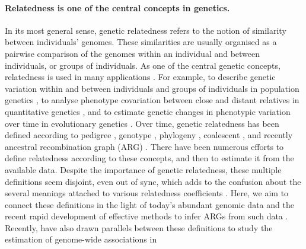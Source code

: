 




\paragraph{Relatedness is one of the central concepts in genetics.}
%
In its most general sense, genetic relatedness refers to the notion of
similarity between individuals' genomes.
%
These similarities are usually organised as a pairwise comparison of the
genomes within an individual and between individuals, or groups of
individuals.
%
As one of the central genetic concepts, relatedness is used in many
applications \citep{weir2006genetic, speed2015relatedness}.
%
For example, to describe genetic variation within and between individuals
and groups of individuals in population genetics
\citep{crow2009introduction, charlesworth2010elements},
to analyse phenotype covariation between close and distant relatives in
quantitative genetics \citep{falconer1996introduction, lynch1998genetics},
and to estimate genetic changes in phenotypic variation over time in
evolutionary genetics \citep{walsh2018evolution, arnold2023evolutionary}.
%
Over time, genetic relatedness has been defined according to
pedigree \citep{fisher1919correlation, wright1922coefficients},
genotype \citep{cotterman1940calculus, malecot1948mathematiques, malecot1969mathemathics},
phylogeny \citep{lynch1991methods},
coalescent \citep{slatkin1991inbreeding}, and
recently ancestral recombination graph (ARG)
\citep{tsambos2022efficient, fan2022genealogical, zhang2023biobank}.
%
There have been numerous efforts to define relatedness according to these
concepts, and then to estimate it from the available data.
%
Despite the importance of genetic relatedness, these multiple definitions
seem disjoint, even out of sync, which adds to the confusion about the
several meanings attached to various relatedness coefficients
\citep{jacquard1975inbreeding, templeton1994inbreeding,
lacy1995clarification, rousset2002inbreeding}.
%
Here, we aim to connect these definitions in the light of today's abundant
genomic data and the recent rapid development of effective methods to infer
ARGs from such data
\cite{speidel2019method, kelleher2019inferring, zhang2023biobank, deng2024robust}.
%
Recently, \cite{schraiber2024unifying} have also drawn parallels between
these definitions to study the estimation of genome-wide associations in
